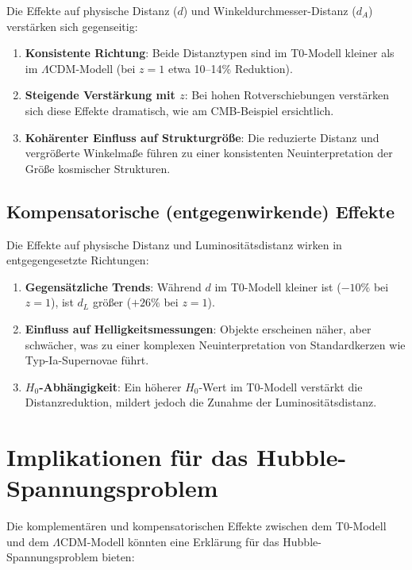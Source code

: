 \documentclass[a4paper,12pt]{article}
\theoremstyle{definition}
\theoremstyle{remark}
\begin{document}
	Die Effekte auf physische Distanz ($d$) und Winkeldurchmesser-Distanz ($d_A$) verstärken sich gegenseitig:
	
	\begin{enumerate}
		\item \textbf{Konsistente Richtung}: Beide Distanztypen sind im T0-Modell kleiner als im \(\Lambda\)CDM-Modell (bei $z = 1$ etwa 10–14\% Reduktion).
		\item \textbf{Steigende Verstärkung mit $z$}: Bei hohen Rotverschiebungen verstärken sich diese Effekte dramatisch, wie am CMB-Beispiel ersichtlich.
		\item \textbf{Kohärenter Einfluss auf Strukturgröße}: Die reduzierte Distanz und vergrößerte Winkelmaße führen zu einer konsistenten Neuinterpretation der Größe kosmischer Strukturen.
	\end{enumerate}
	
	\subsection{Kompensatorische (entgegenwirkende) Effekte}
	
	Die Effekte auf physische Distanz und Luminositätsdistanz wirken in entgegengesetzte Richtungen:
	
	\begin{enumerate}
		\item \textbf{Gegensätzliche Trends}: Während $d$ im T0-Modell kleiner ist ($-10\%$ bei $z = 1$), ist $d_L$ größer ($+26\%$ bei $z = 1$).
		\item \textbf{Einfluss auf Helligkeitsmessungen}: Objekte erscheinen näher, aber schwächer, was zu einer komplexen Neuinterpretation von Standardkerzen wie Typ-Ia-Supernovae führt.
		\item \textbf{$H_0$-Abhängigkeit}: Ein höherer $H_0$-Wert im T0-Modell verstärkt die Distanzreduktion, mildert jedoch die Zunahme der Luminositätsdistanz.
	\end{enumerate}
	
	\section{Implikationen für das Hubble-Spannungsproblem}
	
	Die komplementären und kompensatorischen Effekte zwischen dem T0-Modell und dem \(\Lambda\)CDM-Modell könnten eine Erklärung für das Hubble-Spannungsproblem bieten:
	
\end{document}
